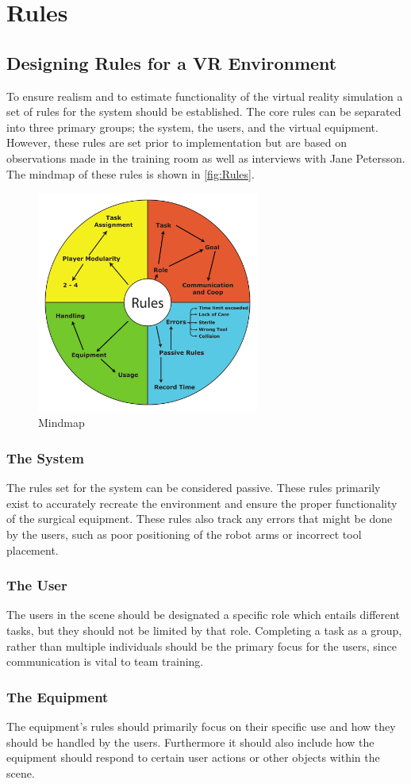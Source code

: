\chapter{Rules}
\section*{Designing Rules for a VR Environment}

To ensure realism and to estimate functionality of the virtual reality simulation a set of rules for the system should be established. The core rules can be separated into three primary groups; the system, the users, and the virtual equipment. However, these rules are set prior to implementation but are based on observations made in the training room as well as interviews with Jane Petersson. The mindmap of these rules is shown in \autoref{fig:Rules}.

\begin{figure}[H]
\centering
\includegraphics[width=0.65\textwidth]{WorksheetRules/brainstorm_rules}
\caption{Mindmap}
\label{fig:Rules}
\end{figure}

\subsection*{The System}
The rules set for the system can be considered passive. These rules primarily exist to accurately recreate the environment and ensure the proper functionality of the surgical equipment. These rules also track any errors that might be done by the users, such as poor positioning of the robot arms or incorrect tool placement.

\subsection*{The User}
The users in the scene should be designated a specific role which entails different tasks, but they should not be limited by that role. Completing a task as a group, rather than multiple individuals should be the primary focus for the users, since communication is vital to team training.

\subsection*{The Equipment}
The equipment's rules should primarily focus on their specific use and how they should be handled by the users. Furthermore it should also include how the equipment should respond to certain user actions or other objects within the scene.
